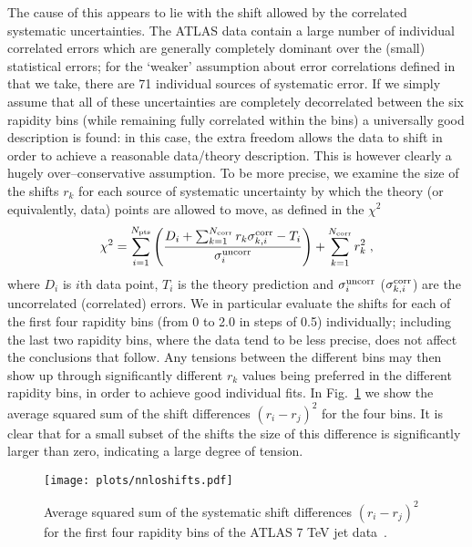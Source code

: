 \documentclass{appolb}
\begin{document}
The cause of this appears to lie with the shift allowed by the correlated systematic uncertainties. The ATLAS data contain a large number of individual correlated errors which are generally completely dominant over the (small) statistical errors; for the `weaker' assumption about error correlations defined in~\cite{Aad:2014vwa} that we take, there are 71 individual sources of systematic error. If we simply assume that all of these uncertainties are completely decorrelated between the six rapidity bins (while remaining fully correlated within the bins) a universally good description is found: in this case, the extra freedom allows the data to shift in order to achieve a reasonable data/theory description. This is however clearly a hugely over--conservative assumption. To be more precise, we examine the size of the shifts $r_k$ for each source of systematic uncertainty by which the theory (or equivalently, data) points are allowed to move, as defined in the $\chi^2$
\begin{equation}
\chi^2=\sum_{i=1}^{N_{\rm pts}}\left(\frac{D_i+\sum_{k=1}^{N_{\rm corr}}r_k\sigma_{k,i}^{\rm corr}-T_i}{\sigma_i^{\rm uncorr}}\right)+\sum_{k=1}^{N_{\rm corr}} r_k^2\;,
\end{equation}
where $D_i$ is $i$th data point, $T_i$ is the theory prediction and $\sigma^{\rm uncorr}_i$ ($\sigma^{\rm corr}_{k,i}$) are the uncorrelated (correlated) errors.
We in particular evaluate the shifts for each of the first four rapidity bins (from 0 to 2.0 in steps of 0.5) individually; including the last two rapidity bins, where the data tend to be less precise, does not affect the conclusions that follow. Any tensions between the different bins may then show up through significantly different $r_k$ values being preferred in the different rapidity bins, in order to achieve good individual fits. In Fig.~\ref{fig:jetshifts} we show the average squared sum of the shift differences $(r_i-r_j)^2$ for the four bins. It is clear that for a small subset  of the shifts the size of this difference is significantly larger than zero, indicating a large degree of tension. 

\begin{figure}[htb]
\centerline{%
\texttt{[image: plots/nnloshifts.pdf]}}
\caption{Average squared sum of the systematic shift differences $(r_i-r_j)^2$ for the first four rapidity bins of the ATLAS 7 TeV jet data~\cite{Aad:2014vwa}.}
\label{fig:jetshifts}
\end{figure}
\end{document}
